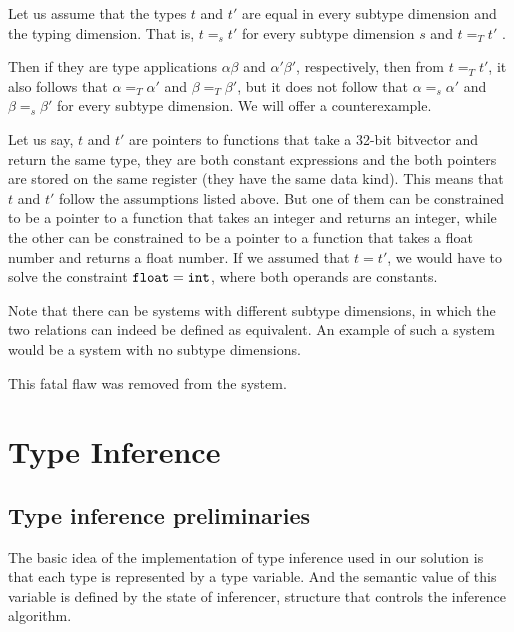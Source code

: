 \begin{ex}
    Let us assume that the types $t$ and $t'$ are equal in every subtype dimension and the typing dimension. That is, $t =_s t'$ for every subtype dimension $s$ and $t =_T t'$ .

    Then if they are type applications $\alpha \beta$ and $\alpha' \beta'$, respectively, then from $t =_T t'$, it also follows that $\alpha =_T \alpha'$ and $\beta =_T \beta'$, but it does not follow that $\alpha =_s \alpha'$ and $\beta =_s \beta'$ for every subtype dimension. We will offer a counterexample.

    Let us say, $t$ and $t'$ are pointers to functions that take a 32-bit bitvector and return the same type, they are both constant expressions and the both pointers are stored on the same register (they have the same data kind). This means that $t$ and $t'$ follow the assumptions listed above. But one of them can be constrained to be a pointer to a function that takes an integer and returns an integer, while the other can be constrained to be a pointer to a function that takes a float number and returns a float number. If we assumed that $t = t'$, we would have to solve the constraint $\mathtt{float} = \mathtt{int}$, where both operands are constants.

    Note that there can be systems with different subtype dimensions, in which the two relations can indeed be defined as equivalent. An example of such a system would be a system with no subtype dimensions.
\end{ex}

This fatal flaw was removed from the system.

\section{Type Inference}

\subsection{Type inference preliminaries}

The basic idea of the implementation of type inference used in our solution is that each type is represented by a type variable. And the semantic value of this variable is defined by the state of inferencer, structure that controls the inference algorithm.

